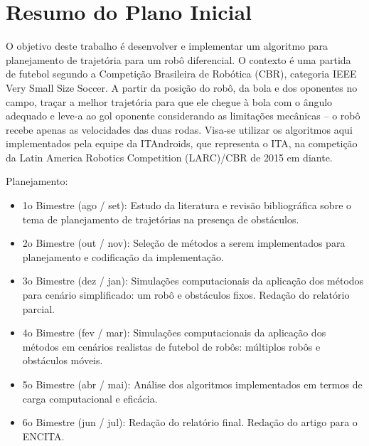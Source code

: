 \documentclass[a4paper,12pt]{article}
\begin{document}




\tableofcontents

\newpage

\section{Resumo do Plano Inicial}
\label{secao:plano_inicial}

O objetivo deste trabalho é desenvolver e implementar um algoritmo para planejamento de trajetória para um robô diferencial. O contexto é uma partida de futebol segundo a Competição Brasileira de Robótica (CBR), categoria IEEE Very Small Size Soccer. A partir da posição do robô, da bola e dos oponentes no campo, traçar a melhor trajetória para que ele chegue à bola com o ângulo adequado e leve-a ao gol oponente considerando as limitações mecânicas – o robô recebe apenas as velocidades das duas rodas. Visa-se utilizar os algoritmos aqui implementados pela equipe da ITAndroids, que representa o ITA, na competição da Latin America Robotics Competition (LARC)/CBR de 2015 em diante.

Planejamento:
\begin{itemize}

\item 1o Bimestre (ago / set): Estudo da literatura e revisão bibliográfica sobre o tema de planejamento de trajetórias na presença de obstáculos.

\item 2o Bimestre (out / nov): Seleção de métodos a serem implementados para planejamento e codificação da implementação.

\item 3o Bimestre (dez / jan): Simulações computacionais da aplicação dos métodos para cenário simplificado: um robô e obstáculos fixos. Redação do relatório parcial.

\item 4o Bimestre (fev / mar): Simulações computacionais da aplicação dos métodos em cenários realistas de futebol de robôs: múltiplos robôs e obstáculos móveis.

\item 5o Bimestre (abr / mai): Análise dos algoritmos implementados em termos de carga computacional e eficácia.

\item 6o Bimestre (jun / jul): Redação do relatório final. Redação do artigo para o ENCITA.

\end{itemize}
\end{document}
